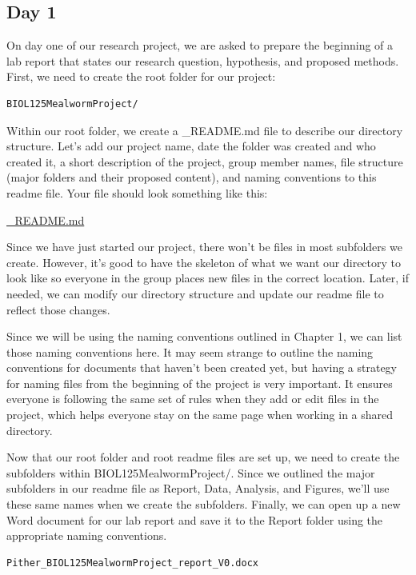 \documentclass[
]{book}
\begin{document}
\subsection*{Day 1}\label{day-1-1}

On day one of our research project, we are asked to prepare the beginning of a lab report that states our research question, hypothesis, and proposed methods. First, we need to create the root folder for our project:

\begin{verbatim}
BIOL125MealwormProject/
\end{verbatim}

Within our root folder, we create a \_README.md file to describe our directory structure. Let's add our project name, date the folder was created and who created it, a short description of the project, group member names, file structure (major folders and their proposed content), and naming conventions to this readme file. Your file should look something like this:

\href{files/DS_biol-125-readme_V0.md}{\_README.md}

Since we have just started our project, there won't be files in most subfolders we create. However, it's good to have the skeleton of what we want our directory to look like so everyone in the group places new files in the correct location. Later, if needed, we can modify our directory structure and update our readme file to reflect those changes.

Since we will be using the naming conventions outlined in Chapter 1, we can list those naming conventions here. It may seem strange to outline the naming conventions for documents that haven't been created yet, but having a strategy for naming files from the beginning of the project is very important. It ensures everyone is following the same set of rules when they add or edit files in the project, which helps everyone stay on the same page when working in a shared directory.

Now that our root folder and root readme files are set up, we need to create the subfolders within BIOL125MealwormProject/. Since we outlined the major subfolders in our readme file as Report, Data, Analysis, and Figures, we'll use these same names when we create the subfolders. Finally, we can open up a new Word document for our lab report and save it to the Report folder using the appropriate naming conventions.

\begin{verbatim}
Pither_BIOL125MealwormProject_report_V0.docx
\end{verbatim}
\end{document}
